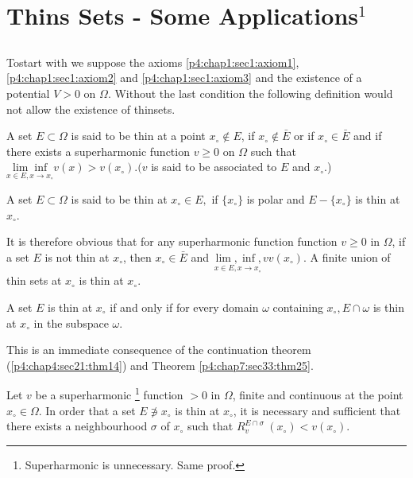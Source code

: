 \chapter{Thins Sets - Some Applications\texorpdfstring{${}^1$}{1}}\label{p4:chap9}
 
\setcounter{section}{37}
\section{}\label{p4:chap9:sec38}%

To\pageoriginale start with we suppose the axioms \ref{p4:chap1:sec1:axiom1},
\ref{p4:chap1:sec1:axiom2} and \ref{p4:chap1:sec1:axiom3}  and the existence
of a potential $V > 0$ on $\Omega$. Without the last condition the
following definition would not allow the existence of thinsets. 

\begin{defn}\label{p4:chap9:sec38:def23} %
  A set $E \subset \Omega$ is said to be thin at a point $x_\circ \notin
  E$, if $x_\circ \notin \bar{E} $ or if $x_\circ \in \bar{E} $ and if there
  exists a superharmonic function $v \ge 0$ on $\Omega$ such that
  $\underset{x \in E, x \to x_\circ}{\lim\inf} v(x) > v(x_\circ). (v$ is said to
  be associated to $E$ and $x_\circ$.) 
\end{defn}

A set $E \subset \Omega$ is said to be thin at $x_\circ \in E, $ if $\{
x_\circ\} $ is polar and $E - \{x_\circ\}$ is thin at $x_\circ$. 

It is therefore obvious that for any superharmonic function function
$v \ge 0$ in $\Omega$, if a set $E$ is not thin at $x_\circ$, then $x_\circ
\in \bar{E}$ and $\underset{x \in E, x \to x_\circ}{\lim, \inf,} v
v(x_\circ)$. A finite union of thin sets at $x_\circ$ is thin at $x_\circ$.  

\begin{prop}\label{p4:chap9:sec38:prop24}
  A set $E$ is thin at $x_\circ$ if and only if for every domain $\omega$
  containing $x_\circ, E \cap \omega$ is thin at $x_\circ$ in the subspace
  $\omega$. 
\end{prop}

This is an immediate consequence of the continuation theorem
(\ref{p4:chap4:sec21:thm14}) and Theorem \ref{p4:chap7:sec33:thm25}. 

\begin{thm}\label{p4:chap9:sec38:thm29}%
  Let $v$ be a superharmonic \footnote{Superharmonic is
    unnecessary. Same proof.} function $> 0$ in $\Omega$, finite and\pageoriginale
  continuous at the point $x_\circ \in \Omega$. In order that a set $E
  \notni x_\circ$ is thin at $x_\circ$, it is necessary and sufficient that
  there exists a neighbourhood $\sigma$ of $x_\circ$ such that $R^{E \cap
    \sigma}_v ~ (x_\circ) < v(x_\circ)$. 
\end{thm}


